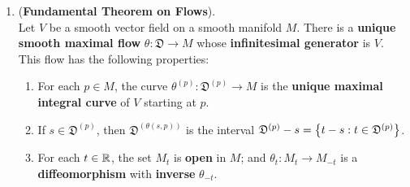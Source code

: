 \documentclass[11pt]{article}
\begin{document}
\begin{itemize}
\begin{remark}
\begin{enumerate}
\item \begin{theorem} (\textbf{Fundamental Theorem on Flows}). \citep{lee2003introduction}\\
Let $V$ be a smooth vector field on a smooth manifold $M$. There is a \textbf{unique smooth maximal flow} $\theta: \mathfrak{D} \rightarrow M$
whose \textbf{infinitesimal generator} is $V$. This flow has the following properties:
\begin{enumerate}
\item For each $p \in M$, the curve $\theta^{(p)}: \mathfrak{D}^{(p)} \rightarrow M$ is the \textbf{unique maximal integral curve} of $V$ starting at $p$.
\item If $s \in \mathfrak{D}^{(p)}$, then $\mathfrak{D}^{(\theta(s, p))}$ is the interval $\mathfrak{D}^{(p)} - s = \left\{t - s: t \in \mathfrak{D}^{(p)}\right\}$.
\item For each $t \in {\mathbb R}$, the set $M_t$ is \textbf{open} in $M$; and $\theta_t: M_t \rightarrow M_{-t}$ is a \textbf{diffeomorphism} with \textbf{inverse} $\theta_{-t}$.
\end{enumerate}
\end{theorem}
\end{enumerate}
\end{remark}
\end{itemize}
\end{document}
